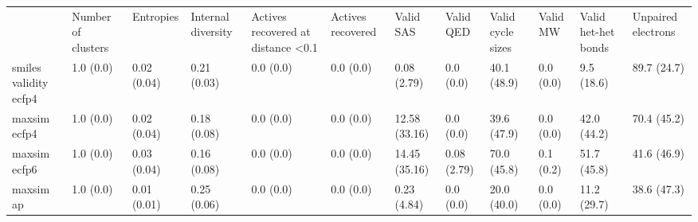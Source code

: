 \begin{tabular}{llllllllllll}
 & Number of clusters & Entropies & Internal diversity & Actives recovered at distance <0.1 & Actives recovered & Valid SAS & Valid QED & Valid cycle sizes & Valid MW & Valid het-het bonds & Unpaired electrons \\
smiles validity ecfp4 & {\cellcolor[HTML]{F6FCFD}} \color[HTML]{000000} 1.0 (0.0) & {\cellcolor[HTML]{F7FCFD}} \color[HTML]{000000} 0.02 (0.04) & {\cellcolor[HTML]{D4EFEC}} \color[HTML]{000000} 0.21 (0.03) & {\cellcolor[HTML]{F7FCFD}} \color[HTML]{000000} 0.0 (0.0) & {\cellcolor[HTML]{F7FCFD}} \color[HTML]{000000} 0.0 (0.0) & {\cellcolor[HTML]{F7FCFD}} \color[HTML]{000000} 0.08 (2.79) & {\cellcolor[HTML]{F7FCFD}} \color[HTML]{000000} 0.0 (0.0) & {\cellcolor[HTML]{8FD4C2}} \color[HTML]{000000} 40.1 (48.9) & {\cellcolor[HTML]{F7FCFD}} \color[HTML]{000000} 0.0 (0.0) & {\cellcolor[HTML]{E9F7FA}} \color[HTML]{000000} 9.5 (18.6) & {\cellcolor[HTML]{006529}} \color[HTML]{F1F1F1} 89.7 (24.7) \\
maxsim ecfp4 & {\cellcolor[HTML]{F6FCFD}} \color[HTML]{000000} 1.0 (0.0) & {\cellcolor[HTML]{F4FBFC}} \color[HTML]{000000} 0.02 (0.04) & {\cellcolor[HTML]{DBF1F1}} \color[HTML]{000000} 0.18 (0.08) & {\cellcolor[HTML]{F7FCFD}} \color[HTML]{000000} 0.0 (0.0) & {\cellcolor[HTML]{F7FCFD}} \color[HTML]{000000} 0.0 (0.0) & {\cellcolor[HTML]{E5F5F9}} \color[HTML]{000000} 12.58 (33.16) & {\cellcolor[HTML]{F7FCFD}} \color[HTML]{000000} 0.0 (0.0) & {\cellcolor[HTML]{90D4C3}} \color[HTML]{000000} 39.6 (47.9) & {\cellcolor[HTML]{F7FCFD}} \color[HTML]{000000} 0.0 (0.0) & {\cellcolor[HTML]{87D0BC}} \color[HTML]{000000} 42.0 (44.2) & {\cellcolor[HTML]{2E9756}} \color[HTML]{F1F1F1} 70.4 (45.2) \\
maxsim ecfp6 & {\cellcolor[HTML]{F6FCFD}} \color[HTML]{000000} 1.0 (0.0) & {\cellcolor[HTML]{F6FCFD}} \color[HTML]{000000} 0.03 (0.04) & {\cellcolor[HTML]{DFF3F5}} \color[HTML]{000000} 0.16 (0.08) & {\cellcolor[HTML]{F7FCFD}} \color[HTML]{000000} 0.0 (0.0) & {\cellcolor[HTML]{F7FCFD}} \color[HTML]{000000} 0.0 (0.0) & {\cellcolor[HTML]{E1F4F6}} \color[HTML]{000000} 14.45 (35.16) & {\cellcolor[HTML]{F7FCFD}} \color[HTML]{000000} 0.08 (2.79) & {\cellcolor[HTML]{2F9858}} \color[HTML]{F1F1F1} 70.0 (45.8) & {\cellcolor[HTML]{F7FCFD}} \color[HTML]{000000} 0.1 (0.2) & {\cellcolor[HTML]{61BF9E}} \color[HTML]{000000} 51.7 (45.8) & {\cellcolor[HTML]{88D1BD}} \color[HTML]{000000} 41.6 (46.9) \\
maxsim ap & {\cellcolor[HTML]{ECF8FB}} \color[HTML]{000000} 1.0 (0.0) & {\cellcolor[HTML]{F1FAFC}} \color[HTML]{000000} 0.01 (0.01) & {\cellcolor[HTML]{CDECE6}} \color[HTML]{000000} 0.25 (0.06) & {\cellcolor[HTML]{F7FCFD}} \color[HTML]{000000} 0.0 (0.0) & {\cellcolor[HTML]{F7FCFD}} \color[HTML]{000000} 0.0 (0.0) & {\cellcolor[HTML]{F7FCFD}} \color[HTML]{000000} 0.23 (4.84) & {\cellcolor[HTML]{F7FCFD}} \color[HTML]{000000} 0.0 (0.0) & {\cellcolor[HTML]{D6F0EE}} \color[HTML]{000000} 20.0 (40.0) & {\cellcolor[HTML]{F7FCFD}} \color[HTML]{000000} 0.0 (0.0) & {\cellcolor[HTML]{E7F6F9}} \color[HTML]{000000} 11.2 (29.7) & {\cellcolor[HTML]{95D6C6}} \color[HTML]{000000} 38.6 (47.3) \\

\end{tabular}
